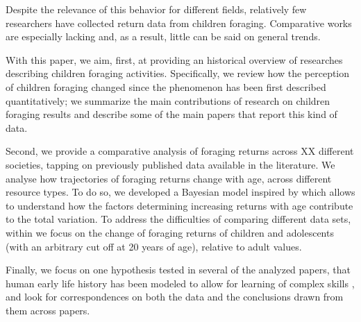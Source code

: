 





Despite the relevance of this behavior for different fields, relatively few researchers have collected return data from children foraging. Comparative works are especially lacking and, as a result, little can be said on general trends. 



\vspace{0.5cm}
With this paper, we aim, first, at providing an historical overview of researches describing children foraging activities. 
Specifically, we review how the perception of children foraging changed since the phenomenon has been first described quantitatively; we summarize the main contributions of research on children foraging results and describe some of the main papers that report this kind of data.

Second, we provide a comparative analysis of foraging returns across XX different societies, tapping on previously published data available in the literature. 
We analyse how trajectories of foraging returns change with age, across different resource types. To do so, we developed a Bayesian model inspired by \cite{koster_life_2019} which allows to understand how the factors determining increasing returns with age contribute to the total variation. 
To address the difficulties of comparing different data sets, within we focus on the change of foraging returns of children and adolescents (with an arbitrary cut off at 20 years of age), relative to adult values.

Finally, we focus on one hypothesis tested in several of the analyzed papers, that human early life history has been modeled to allow for learning of complex skills \cite{kaplan_theory_2000}, and look for correspondences on both the data and the conclusions drawn from them across papers.  


